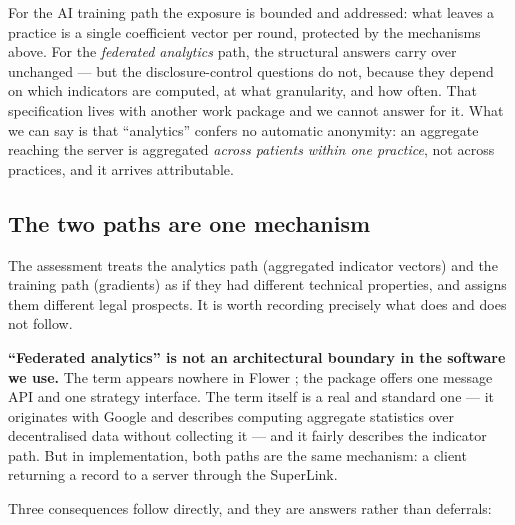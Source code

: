 \label{sec:aggdisclosure}
\statusMethod

\begin{shortanswer}
For the AI training path the exposure is bounded and addressed: what leaves a practice is a single
coefficient vector per round, protected by the mechanisms above. For the \emph{federated analytics}
path, the structural answers carry over unchanged --- but the disclosure-control questions do not,
because they depend on which indicators are computed, at what granularity, and how often. That
specification lives with another work package and we cannot answer for it. What we can say is that
``analytics'' confers no automatic anonymity: an aggregate reaching the server is aggregated
\emph{across patients within one practice}, not across practices, and it arrives attributable.
\end{shortanswer}

\subsection{The two paths are one mechanism}

The assessment treats the analytics path (aggregated indicator vectors) and the training path
(gradients) as if they had different technical properties, and assigns them different legal
prospects. It is worth recording precisely what does and does not follow.

\textbf{``Federated analytics'' is not an architectural boundary in the software we use.} The term
appears nowhere in Flower \FlwrVersion{}; the package offers one message API and one strategy
interface. The term itself is a real and standard one --- it originates with Google
\cite{fedanalytics} and describes computing aggregate statistics over decentralised data without
collecting it --- and it fairly describes the indicator path. But in implementation, both paths are
the same mechanism: a client returning a record to a server through the SuperLink.

Three consequences follow directly, and they are answers rather than deferrals:

